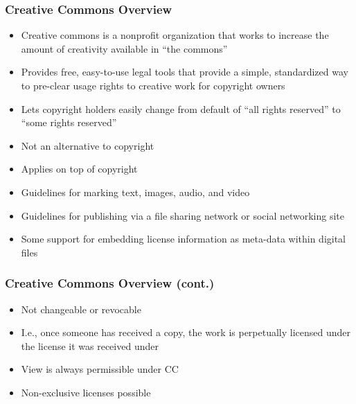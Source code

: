 \documentclass[mathserif,xcolor=dvipsnames,hyperref={bookmarks=true}]{beamer}
\begin{document}
    \begin{frame}[t]
        \frametitle{Creative Commons Overview}
        \begin{itemize}
            \item<2-> Creative commons is a nonprofit organization that works to
                  increase the amount of creativity available in ``the commons''
            \item<3-> Provides free, easy-to-use legal tools that provide a simple,
                  standardized way to pre-clear usage rights to creative work for
                  copyright owners
            \item<4-> Lets copyright holders easily change from default of ``all
                  rights reserved'' to ``some rights reserved''
            \item<5-> Not an alternative to copyright
            \item<6-> Applies on top of copyright
            \item<7-> Guidelines for marking text, images, audio, and video
            \item<8-> Guidelines for publishing via a file sharing network or
                  social networking site
            \item<9-> Some support for embedding license information as meta-data
                  within digital files
        \end{itemize}
    \end{frame}

    \begin{frame}[t]
        \frametitle{Creative Commons Overview (cont.)}
        \begin{itemize}
            \item<2-> Not changeable or revocable
            \item<3-> I.e., once someone has received a copy, the work is
                  perpetually licensed under the license it was received under
            \item<4-> View is always permissible under CC
            \item<5-> Non-exclusive licenses possible
        \end{itemize}
    \end{frame}
\end{document}
